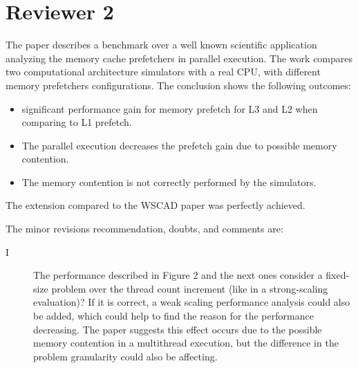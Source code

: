 \documentclass{article}
\begin{document}
\section*{Reviewer 2}

The paper describes a benchmark over a well known scientific application analyzing the memory cache prefetchers in parallel execution.
The work compares two computational architecture simulators with a real CPU, with different memory prefetchers configurations.
The conclusion shows the following outcomes:

\begin{itemize}
    \item significant performance gain for memory prefetch for L3 and L2 when comparing to L1 prefetch.
    \item The parallel execution decreases the prefetch gain due to possible memory contention.
    \item The memory contention is not correctly performed by the simulators.
\end{itemize}

The extension compared to the WSCAD paper was perfectly achieved.\vspace{.5cm}

The minor revisions recommendation, doubts, and comments are:

\begin{description}
    \item[I] The performance described in Figure 2 and the next ones consider a fixed-size problem over the thread count increment (like in a strong-scaling evaluation)? If it is correct, a weak scaling performance analysis could also be added, which could help to find the reason for the performance decreasing. The paper suggests this effect occurs due to the possible memory contention in a multithread execution, but the difference in the problem granularity could also be affecting.
\end{description}
\end{document}
